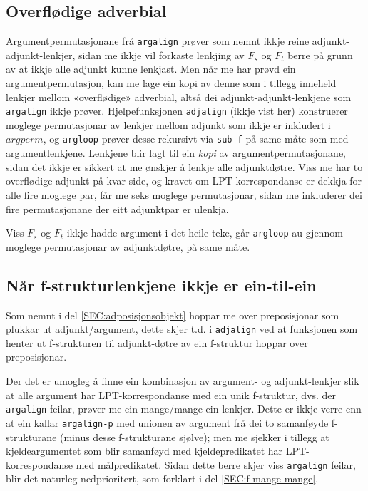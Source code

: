\documentclass[11pt,a4paper,oneside,draft]{book}
\begin{document}
\subsection{Overflødige adverbial}
\label{sec-4.1.1}

   \label{SEC:impl-adjalign}

Argumentpermutasjonane frå \texttt{argalign} prøver som nemnt ikkje reine
adjunkt-adjunkt-lenkjer, sidan me ikkje vil forkaste lenkjing av $F_s$
og $F_t$ berre på grunn av at ikkje alle adjunkt kunne lenkjast. Men
når me har prøvd ein argumentpermutasjon, kan me lage ein kopi av
denne som i tillegg inneheld lenkjer mellom «overflødige» adverbial,
altså dei adjunkt-adjunkt-lenkjene som \texttt{argalign} ikkje
prøver. Hjelpefunksjonen \texttt{adjalign} (ikkje vist her) konstruerer
moglege permutasjonar av lenkjer mellom adjunkt som ikkje er inkludert
i $argperm$, og \texttt{argloop} prøver desse rekursivt via \texttt{sub-f} på same
måte som med argumentlenkjene. Lenkjene blir lagt til ein \emph{kopi} av
argumentpermutasjonane, sidan det ikkje er sikkert at me ønskjer å
lenkje alle adjunktdøtre. Viss me har to overflødige adjunkt på kvar
side, og kravet om LPT-korrespondanse er dekkja for alle fire moglege
par, får me seks moglege permutasjonar, sidan me inkluderer dei fire
permutasjonane der eitt adjunktpar er ulenkja.

Viss $F_s$ og $F_t$ ikkje hadde argument i det heile teke, går
\texttt{argloop} au gjennom moglege permutasjonar av adjunktdøtre, på same
måte.
\subsection{Når f-strukturlenkjene ikkje er ein-til-ein}
\label{sec-4.1.2}

 Som nemnt i del \ref{SEC:adposisjonsobjekt} hoppar me over
 preposisjonar som plukkar ut adjunkt/argument, dette skjer t.d. i
 \texttt{adjalign} ved at funksjonen som henter ut f-strukturen til
 adjunkt-døtre av ein f-struktur hoppar over preposisjonar.

 Der det er umogleg å finne ein kombinasjon av argument- og
 adjunkt-lenkjer slik at alle argument har LPT-korrespondanse med ein
 unik f-struktur, dvs. der \texttt{argalign} feilar, prøver me
 ein-mange/mange-ein-lenkjer. Dette er ikkje verre enn at ein kallar
 \texttt{argalign-p} med unionen av argument frå dei to samanføyde
 f-strukturane (minus desse f-strukturane sjølve); men me sjekker i
 tillegg at kjeldeargumentet som blir samanføyd med kjeldepredikatet
 har LPT-korrespondanse med målpredikatet. Sidan dette berre skjer
 viss \texttt{argalign} feilar, blir det naturleg nedprioritert, som forklart
 i del \ref{SEC:f-mange-mange}.
\end{document}
